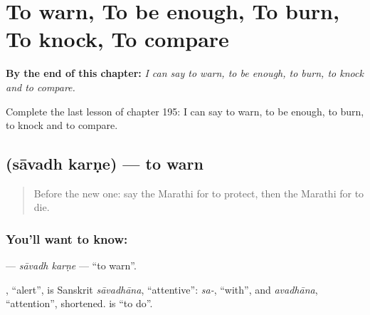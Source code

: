 
\chapter{To warn, To be enough, To burn, To knock, To compare}
\label{ch:mr-to-warn-to-be-enough-to-burn-to-knock-to-compare}

\begin{chapteropening}
\textbf{By the end of this chapter:} \emph{I can say to warn, to be enough, to burn, to knock and to compare.}

Complete the last lesson of chapter 195: I can say to warn, to be enough, to burn, to knock and to compare.
\end{chapteropening}

\section[\texorpdfstring{\mr{सावध} \mr{करणे} (sāvadh karṇe)}{सावध करणे (sāvadh karṇe)}]{  (sāvadh karṇe) — to warn}

\label{lesson:MR-C195-savadh-karne}



\begin{quote}
Before the new one: say the Marathi for to protect, then the Marathi for to die.
\end{quote}

\subsection*{You'll want to know:  }
\textbf{ } — \emph{sāvadh karṇe} — \textquotedblleft{}to warn\textquotedblright{}.

\begin{cousinweb}
\textbf{}, \textquotedblleft{}alert\textquotedblright{}, is Sanskrit \emph{sāvadhāna}, \textquotedblleft{}attentive\textquotedblright{}: \emph{sa-}, \textquotedblleft{}with\textquotedblright{}, and \emph{avadhāna}, \textquotedblleft{}attention\textquotedblright{}, shortened. \textbf{} is \textquotedblleft{}to do\textquotedblright{}.
\end{cousinweb}

